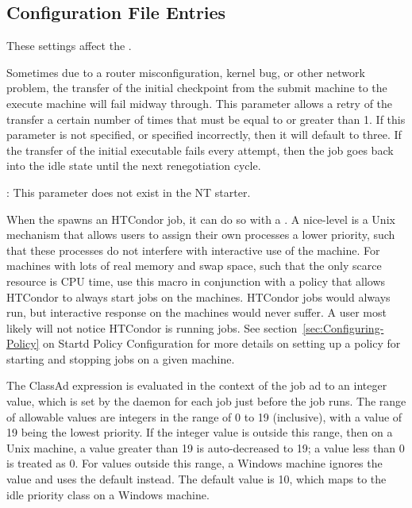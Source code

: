\subsection{\label{sec:Starter-Config-File-Entries}
Configuration File Entries}

These settings affect the .
\begin{description}

\label{param:ExecTransferAttempts}
\item[\Macro{EXEC\_TRANSFER\_ATTEMPTS}]
  Sometimes due to a router misconfiguration, kernel bug, or other
  network problem, the transfer of the initial checkpoint from
  the submit machine to the execute machine will fail midway through.
  This parameter allows a retry of the transfer a certain number of times
  that must be equal to or greater than 1. If this parameter is not
  specified, or specified incorrectly, then it will default to three.
  If the transfer of the initial executable fails every attempt, then
  the job goes back into the idle state until the next renegotiation
  cycle.

  \Note: This parameter does not exist in the NT starter.

\label{param:JobReniceIncrement}
\item[\Macro{JOB\_RENICE\_INCREMENT}]
  When the  spawns an HTCondor job, it can do so with a
  .
  A nice-level is a
  Unix mechanism that allows users to assign their own processes a lower 
  priority, such that these processes do not interfere with interactive
  use of the machine.
  For machines with lots
  of real memory and swap space, such that the only scarce resource is CPU time,
  use this macro in conjunction with a policy that
  allows HTCondor to always start jobs on the machines. 
  HTCondor jobs would always run,
  but interactive response on the machines would never suffer.
  A user most likely will not notice HTCondor is
  running jobs.  See section~\ref{sec:Configuring-Policy} on
  Startd Policy Configuration for more details on setting up a
  policy for starting and stopping jobs on a given machine.

  The ClassAd expression is evaluated in the context of the job ad
  to an integer value, which is
  set by the  daemon for each job just before the
  job runs.
  The range of allowable values are integers in the range of 0 to 19
  (inclusive),
  with a value of 19 being the lowest priority.  
  If the integer value is outside this range,
  then on a Unix machine, a value greater than 19 is auto-decreased to 19;
  a value less than 0 is treated as 0.
  For values outside this range, a Windows machine ignores the value
  and uses the default instead.
  The default value is 10, which maps to the idle priority class on
  a Windows machine.


\end{description}
